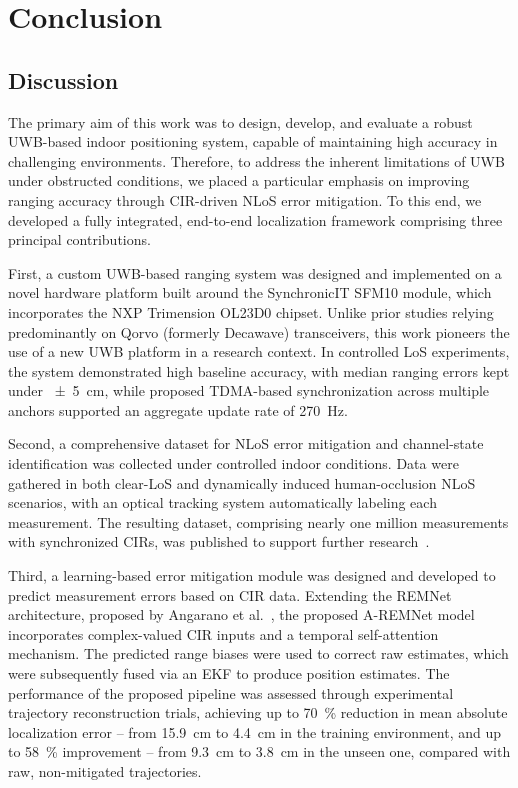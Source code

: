 \chapter{Conclusion}

\section{Discussion}
The primary aim of this work was to design, develop, and evaluate a robust UWB-based indoor positioning system, capable of maintaining high accuracy in challenging environments. Therefore, to address the inherent limitations of UWB under obstructed conditions, we placed a particular emphasis on improving ranging accuracy through CIR-driven NLoS error mitigation. To this end, we developed a fully integrated, end-to-end localization framework comprising three principal contributions.

First, a custom UWB-based ranging system was designed and implemented on a novel hardware platform built around the SynchronicIT SFM10 module, which incorporates the NXP Trimension OL23D0 chipset. Unlike prior studies relying predominantly on Qorvo (formerly Decawave) transceivers, this work pioneers the use of a new UWB platform in a research context. In controlled LoS experiments, the system demonstrated high baseline accuracy, with median ranging errors kept under \SI{\pm 5}{\centi\metre}, while proposed TDMA-based synchronization across multiple anchors supported an aggregate update rate of \SI{270}{\hertz}.

Second, a comprehensive dataset for NLoS error mitigation and channel-state identification was collected under controlled indoor conditions. Data were gathered in both clear-LoS and dynamically induced human-occlusion NLoS scenarios, with an optical tracking system automatically labeling each measurement. The resulting dataset, comprising nearly one million measurements with synchronized CIRs, was published to support further research~\cite{yaroshevych_2025_rangecir}.

Third, a learning-based error mitigation module was designed and developed to predict measurement errors based on CIR data. Extending the REMNet architecture, proposed by Angarano et al.~\cite{Simone2021UWB}, the proposed A-REMNet model incorporates complex-valued CIR inputs and a temporal self-attention mechanism. The predicted range biases were used to correct raw estimates, which were subsequently fused via an EKF to produce position estimates. The performance of the proposed pipeline was assessed through experimental trajectory reconstruction trials, achieving up to \SI{70}{\percent} reduction in mean absolute localization error -- from \SI{15.9}{\centi\metre} to \SI{4.4}{\centi\metre} in the training environment, and up to \SI{58}{\percent} improvement -- from \SI{9.3}{\centi\metre} to \SI{3.8}{\centi\metre} in the unseen one, compared with raw, non-mitigated trajectories.

